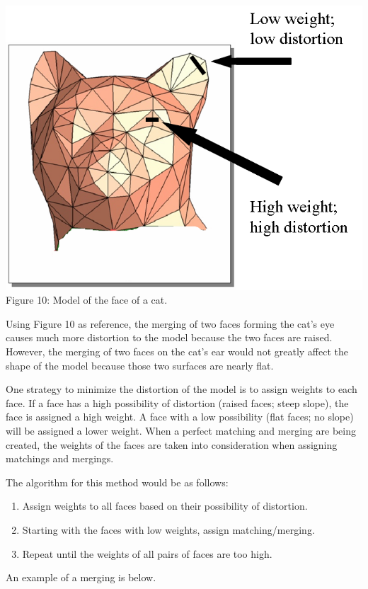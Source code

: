 \documentclass[12pt]{article}
\begin{document}
\begin{flushleft}
\begin{center}
\includegraphics[scale=0.5]{images/distortion.png}\\
Figure 10: Model of the face of a cat.
\end{center}

\medskip
Using Figure 10 as reference, the merging of two faces forming the cat's eye causes much more distortion to the model because the two faces are raised. However, the merging of two faces on the cat's ear would not greatly affect the shape of the model because those two surfaces are nearly flat.

\medskip
One strategy to minimize the distortion of the model is to assign weights to each face. If a face has a high possibility of distortion (raised faces; steep slope), the face is assigned a high weight. A face with a low possibility (flat faces; no slope) will be assigned a lower weight. When a perfect matching and merging are being created, the weights of the faces are taken into consideration when assigning matchings and mergings.

\medskip
The algorithm for this method would be as follows:
\begin{enumerate}
\item Assign weights to all faces based on their possibility of distortion.
\item Starting with the faces with low weights, assign matching/merging.
\item Repeat until the weights of all pairs of faces are too high.
\end{enumerate}

\medskip
An example of a merging is below.

\end{flushleft}
\end{document}
